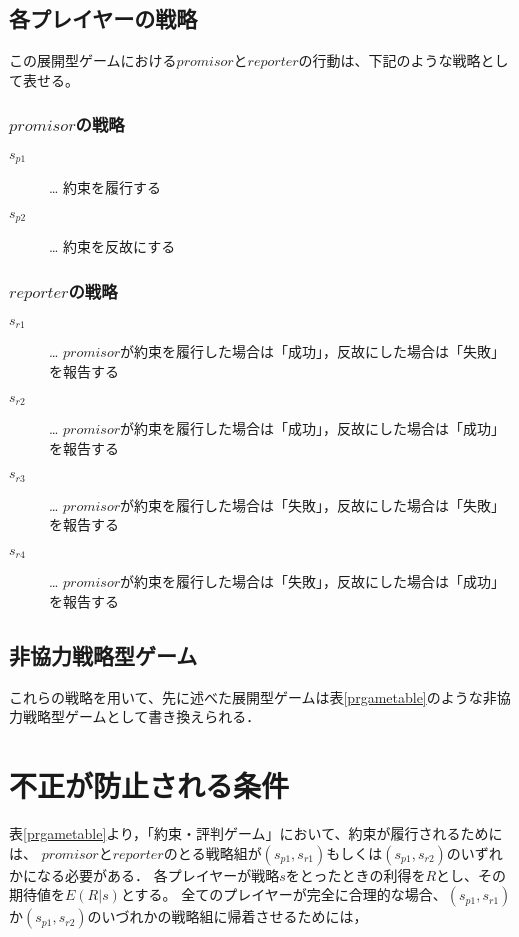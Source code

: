 

\subsection{各プレイヤーの戦略}
\label{playersStrategy}
この展開型ゲームにおける$promisor$と$reporter$の行動は、下記のような戦略として表せる。

\subsubsection{$promisor$の戦略}
\begin{description}
  \item[$s_{p1}$]… 約束を履行する
  \item[$s_{p2}$]… 約束を反故にする
\end{description}

\subsubsection{$reporter$の戦略}
\begin{description}
  \item[$s_{r1}$]… $promisor$が約束を履行した場合は「成功」，反故にした場合は「失敗」を報告する
  \item[$s_{r2}$]… $promisor$が約束を履行した場合は「成功」，反故にした場合は「成功」を報告する
  \item[$s_{r3}$]… $promisor$が約束を履行した場合は「失敗」，反故にした場合は「失敗」を報告する
  \item[$s_{r4}$]… $promisor$が約束を履行した場合は「失敗」，反故にした場合は「成功」を報告する
\end{description}

\subsection{非協力戦略型ゲーム}
これらの戦略を用いて、先に述べた展開型ゲームは表\ref{prgametable}のような非協力戦略型ゲームとして書き換えられる．


\section{不正が防止される条件}
表\ref{prgametable}より，「約束・評判ゲーム」において、約束が履行されるためには、
$promisor$と$reporter$のとる戦略組が$ (s_{p1}, s_{r1})$もしくは$(s_{p1}, s_{r2})$のいずれかになる必要がある．
各プレイヤーが戦略$s$をとったときの利得を$R$とし、その期待値を$E(R|s)$とする。
全てのプレイヤーが完全に合理的な場合、$(s_{p1}, s_{r1})$か$(s_{p1}, s_{r2})$のいづれかの戦略組に帰着させるためには，


